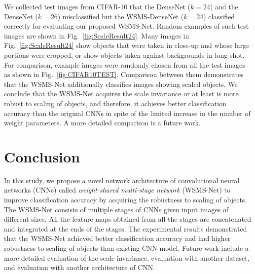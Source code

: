 \documentclass[journal]{IEEEtran}
\begin{document}
We collected test images from CIFAR-10 that the DenseNet ($k=24$) and the DenseNet ($k=26$) misclassified but the WSMS-DenseNet ($k=24$) classified correctly for evaluating our proposed WSMS-Net.
Random examples of such test images are shown in Fig.~\ref{fig:ScaleResult24}.
Many images in Fig.~\ref{fig:ScaleResult24} show objects that were taken in close-up and whose large portions were cropped, or show objects taken against backgrounds in long shot.
For comparison, example images were randomly chosen from all the test images as shown in Fig.~\ref{fig:CIFAR10TEST}.
Comparison between them demonstrates that the WSMS-Net additionally classifies images showing scaled objects.
We conclude that the WSMS-Net acquires the scale invariance or at least is more robust to scaling of objects, and therefore, it achieves better classification accuracy than the original CNNs in spite of the limited increase in the number of weight parameters.
A more detailed comparison is a future work.



\section{Conclusion}

In this study, we propose a novel network architecture of convolutional neural networks (CNNs) called \emph{weight-shared multi-stage network} (WSMS-Net) to improve classification accuracy by acquiring the robustness to scaling of objects.
The WSMS-Net consists of multiple stages of CNNs given input images of different sizes.
All the feature maps obtained from all the stages are concatenated and integrated at the ends of the stages.
The experimental results demonstrated that the WSMS-Net achieved better classification accuracy and had higher robustness to scaling of objects than existing CNN model.
Future work include a more detailed evaluation of the scale invariance, evaluation with another dataset, and evaluation with another architecture of CNN.
\end{document}
